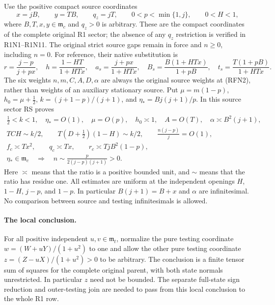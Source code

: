 Use the positive compact source coordinates
\[
 x=jB,\qquad y=TB,\qquad q_z=jT,\qquad
 0<p<\min\{1,j\},\qquad 0<H<1,                         \tag{RFN1}
\]
where $B,T,x,y\in\mathfrak m_c$ and $q_z>0$ is arbitrary. These are
the compact coordinates of the complete original R1 sector; the absence
of any $q_z$ restriction is verified in R1N1--R1N11.  The original
strict source gaps remain in force and $n\geq0$, including $n=0$.
For reference, their native substitution is
\[
 r=\frac{j-p}{j+px},\quad
 h=\frac{1-HT}{1+HTx},\quad
 a_s=\frac{j+px}{1+HTx},\quad
 B_s=\frac{B(1+HTx)}{1+pB},\quad
 t_s=\frac{T(1+pB)}{1+HTx}.                              \tag{RFN2}
\]
The six weights $n,m,C,A,D,\alpha$ are always the original source
weights at (RFN2), rather than weights of an auxiliary stationary
source.  Put $\mu=m(1-p)$, $h_0=\mu+\tfrac12$,
$k=(j+1-p)/(j+1)$, and $\eta_*=Bj(j+1)/p$.
In this source sector RS proves
\begin{gather}
 \tfrac12<k<1,\quad \eta_*=O(1),\quad
 \mu=O(p),\quad h_0\asymp1,\quad A=O(T),\quad
 \alpha\asymp B^2(j+1),                                  \tag{RFN3a}\\
 TCH\sim k/2,\qquad T(D+\tfrac12)(1-H)\sim k/2,\qquad
 \frac{n(j-p)}j=O(1),                                   \tag{RFN3b}\\
 f_c\asymp Tx^2,\qquad q_c\asymp Tx,\qquad
 r_c\asymp TjB^2(1-p),                                  \tag{RFN3c}\\
 \eta_*\in\mathfrak m_c\quad\Longrightarrow\quad
 n\sim\frac{p}{2(j-p)(j+1)}>0.                           \tag{RFN3d}
\end{gather}
Here $\asymp$ means that the ratio is a positive bounded unit, and
$\sim$ means that the ratio has residue one.  All estimates are uniform
at the independent openings $H$, $1-H$, $j-p$, and $1-p$.
In particular $B(j+1)=B+x$ and $\alpha$ are infinitesimal.
No comparison between source and testing infinitesimals is allowed.

\paragraph{The local conclusion.}
For all positive independent $u,v\in\mathfrak m_t$, normalize the pure
testing coordinate $w=(W+uY)/(1+u^2)$ to one and allow the other pure
testing coordinate $z=(Z-uX)/(1+u^2)>0$ to be arbitrary.  The conclusion
is a finite tensor sum of squares for the complete original parent,
with both state normals unrestricted.  In particular $z$ need not be
bounded.  The separate full-state sign reduction and outer-testing join
are needed to pass from this local conclusion to the whole R1 row.

